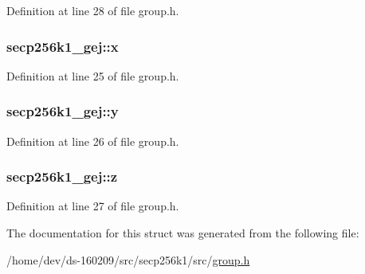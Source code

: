 Definition at line 28 of file group.\+h.

\hypertarget{structsecp256k1__gej_a7d2451c89411d62628ac466eb28c8ff5}{}
\subsubsection[{x}]{ secp256k1\+\_\+gej\+::x}\label{structsecp256k1__gej_a7d2451c89411d62628ac466eb28c8ff5}


Definition at line 25 of file group.\+h.

\hypertarget{structsecp256k1__gej_a29d5184060ad790d85a0c89a13820e0d}{}
\subsubsection[{y}]{ secp256k1\+\_\+gej\+::y}\label{structsecp256k1__gej_a29d5184060ad790d85a0c89a13820e0d}


Definition at line 26 of file group.\+h.

\hypertarget{structsecp256k1__gej_ae41776408dba32cbe28b5e345b5f2286}{}
\subsubsection[{z}]{ secp256k1\+\_\+gej\+::z}\label{structsecp256k1__gej_ae41776408dba32cbe28b5e345b5f2286}


Definition at line 27 of file group.\+h.



The documentation for this struct was generated from the following file\+:\begin{DoxyCompactItemize}
\item 
/home/dev/ds-\/160209/src/secp256k1/src/\hyperlink{group_8h}{group.\+h}\end{DoxyCompactItemize}
